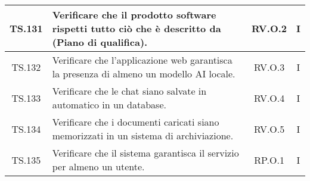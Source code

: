 {{{{{{{{{{\begin{xltabular}{\textwidth}{|c|X|c|c|}
\hline
TS.131 & Verificare che il prodotto software rispetti tutto ciò che è descritto da (Piano di qualifica). & RV.O.2 & I \\
\hline
TS.132 & Verificare che l’applicazione web garantisca la presenza di almeno un modello AI locale. & RV.O.3 & I \\
\hline
TS.133 & Verificare che le chat siano salvate in automatico in un database. & RV.O.4 & I \\
\hline
TS.134 & Verificare che i documenti caricati siano memorizzati in un sistema di archiviazione. & RV.O.5 & I \\
\hline
TS.135 & Verificare che il sistema garantisca il servizio per almeno un utente. & RP.O.1 & I \\
\hline

    \end{xltabular}
    }

      
}}}}}}}}}
